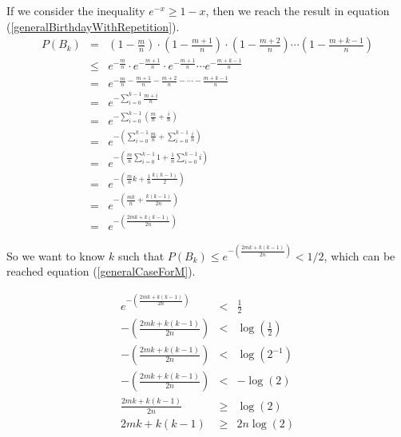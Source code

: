 \documentclass[tikz, 12pt]{scrartcl}
\begin{document}
\begin{enumerate}
	If we consider the inequality $e^{-x} \geq 1-x$, then we reach the result in equation (\ref{generalBirthdayWithRepetition}).
	\begin{eqnarray}
	P(B_k)	&	=	&	\left(1 - \frac{m}{n} \right) \cdot \left(1 -  \frac{m + 1}{n} \right)\cdot \left(1 -  \frac{m + 2}{n} \right) \cdots \left(1 -  \frac{m + k-1}{n} \right) \nonumber \\
			&	\leq	&	e^{-\frac{m}{n}} \cdot e^{-\frac{m+1}{n}}\cdot e^{-\frac{m+1}{n}} \cdots e^{-\frac{m+k - 1}{n}} \nonumber \\
			&	=	&	e^{-\frac{m}{n}-\frac{m + 1}{n} -\frac{m + 2}{n} - \cdots -\frac{m + k -1}{n}} \nonumber\\
			&	=	&	e^{-\sum_{i=0}^{k - 1}\frac{m + i}{n} }\nonumber \\
			&	=	&	e^{-\sum_{i=0}^{k - 1}\left( \frac{m}{n}  + \frac{i}{n} \right)}  \nonumber \\
			&	=	&	e^{-\left( \sum_{i=0}^{k - 1} \frac{m}{n}  + \sum_{i=0}^{k - 1} \frac{i}{n} \right)}  \nonumber \\
			&	=	&	e^{-\left( \frac{m}{n} \sum_{i=0}^{k - 1} 1 + \frac{1}{n}\sum_{i=0}^{k - 1} i \right)}  \nonumber \\			
			&	=	&	e^{-\left( \frac{m}{n} k+ \frac{1}{n}\frac{k(k -1)}{2} \right)}  \nonumber \\	
			&	=	&	e^{-\left( \frac{mk}{n}+ \frac{k(k -1)}{2n}\right)}  \nonumber \\	
			&	=	&	e^{-\left(\frac{2mk + k(k - 1)}{2n} \right)}  \label{generalBirthdayWithRepetition}			
	\end{eqnarray}
	
	So we want to know $k$ such that $P(B_k) \leq e^{-\left(\frac{2mk + k(k - 1)}{2n} \right)} < 1/2$, which can be reached equation (\ref{generalCaseForM}).
	
	\begin{eqnarray}
	e^{-\left(\frac{2mk + k(k - 1)}{2n} \right)} 	&	<	&	\frac{1}{2} \nonumber \\
	-\left(\frac{2mk + k(k - 1)}{2n} \right)		&	<	&	\log\left( \frac{1}{2} \right) \nonumber \\
	-\left(\frac{2mk + k(k - 1)}{2n} \right)		&	<	&	\log ( 2^{-1} ) \nonumber \\
	-\left(\frac{2mk + k(k - 1)}{2n} \right)		&	<	&	-\log( 2) \nonumber \\
	\frac{2mk + k(k - 1)}{2n} 				&	\geq	&	\log( 2) \nonumber \\
	2mk + k(k - 1)						&	\geq	&	2n \log(2) \label{generalCaseForM}
	\end{eqnarray}
	

\end{enumerate}
\end{document}

